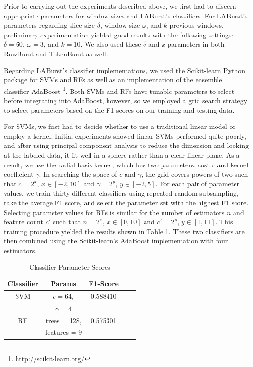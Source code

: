 \documentclass[letterpaper]{article}
\begin{document}
Prior to carrying out the experiments described above, we first had to discern appropriate parameters for window sizes and LABurst's classifiers.
For LABurst's parameters regarding slice size $\delta$, window size $\omega$, and $k$ previous windows, preliminary experimentation yielded good results with the following settings: $\delta = 60$, $\omega = 3$, and $k=10$.
We also used these $\delta$ and $k$ parameters in both RawBurst and TokenBurst as well.

Regarding LABurst's classifier implementations, we used the Scikit-learn Python package for SVMs and RFs as well as an implementation of the ensemble classifier AdaBoost  \footnote{http://scikit-learn.org/}.
Both SVMs and RFs have tunable parameters to select before integrating into AdaBoost, however, so we employed a grid search strategy to select parameters based on the F1 scores on our training and testing data.

For SVMs, we first had to decide whether to use a traditional linear model or employ a kernel.
Initial experiments showed linear SVMs performed quite poorly, and after using principal component analysis to reduce the dimension and looking at the labeled data, it fit well in a sphere rather than a clear linear plane. 
As a result, we use the radial basis kernel, which has two parameters: cost $c$ and kernel coefficient $\gamma$.
In searching the space of $c$ and $\gamma$, the grid covers powers of two such that $c = 2^x$, $x \in [-2, 10]$ and $\gamma = 2^y$, $y \in [-2, 5]$.
For each pair of parameter values, we train thirty different classifiers using repeated random subsampling, take the average F1 score, and select the parameter set with the highest F1 score.
Selecting parameter values for RFs is similar for the number of estimators $n$ and feature count $c'$ such that $n = 2^x$, $x \in [0, 10]$ and $c' = 2^y$, $y \in [1, 11]$.
This training procedure yielded the results shown in Table \ref{tab:scores}.
These two classifiers are then combined using the Scikit-learn's AdaBoost implementation with four estimators.

\begin{table}[htdp]
\footnotesize
\caption{Classifier Parameter Scores}
\begin{center}
\begin{tabular}{|c|c|c|c|c|}
\hline
\textbf{Classifier} & \textbf{Params} & \textbf{F1-Score} \\ \hline
SVM & $c=64,$ & 0.588410 \\ 
& $\gamma=4$ & \\ \hline
RF & trees = 128, & 0.575301 \\
& features = 9 &  \\ \hline
\end{tabular}
\end{center}
\label{tab:scores}
\end{table}
\end{document}
